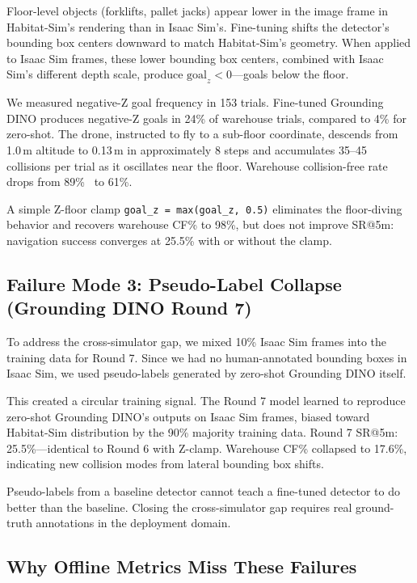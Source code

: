 \documentclass{article}
\begin{document}
Floor-level objects (forklifts, pallet jacks) appear lower in the image frame in Habitat-Sim's rendering than in Isaac Sim's. Fine-tuning shifts the detector's bounding box centers downward to match Habitat-Sim's geometry. When applied to Isaac Sim frames, these lower bounding box centers, combined with Isaac Sim's different depth scale, produce $\text{goal}_z < 0$---goals below the floor.

We measured negative-Z goal frequency in 153 trials. Fine-tuned Grounding DINO produces negative-Z goals in 24\% of warehouse trials, compared to 4\% for zero-shot. The drone, instructed to fly to a sub-floor coordinate, descends from 1.0\,m altitude to 0.13\,m in approximately 8 steps and accumulates 35--45 collisions per trial as it oscillates near the floor. Warehouse collision-free rate drops from 89\%~\cite{anon2026engineering} to 61\%.

A simple Z-floor clamp \verb|goal_z = max(goal_z, 0.5)| eliminates the floor-diving behavior and recovers warehouse CF\% to 98\%, but does not improve SR@5m: navigation success converges at 25.5\% with or without the clamp.

\subsection{Failure Mode 3: Pseudo-Label Collapse (Grounding DINO Round 7)}

To address the cross-simulator gap, we mixed 10\% Isaac Sim frames into the training data for Round 7. Since we had no human-annotated bounding boxes in Isaac Sim, we used pseudo-labels generated by zero-shot Grounding DINO itself.

This created a circular training signal. The Round 7 model learned to reproduce zero-shot Grounding DINO's outputs on Isaac Sim frames, biased toward Habitat-Sim distribution by the 90\% majority training data. Round 7 SR@5m: 25.5\%---identical to Round 6 with Z-clamp. Warehouse CF\% collapsed to 17.6\%, indicating new collision modes from lateral bounding box shifts.

Pseudo-labels from a baseline detector cannot teach a fine-tuned detector to do better than the baseline. Closing the cross-simulator gap requires real ground-truth annotations in the deployment domain.

\subsection{Why Offline Metrics Miss These Failures}
\end{document}
